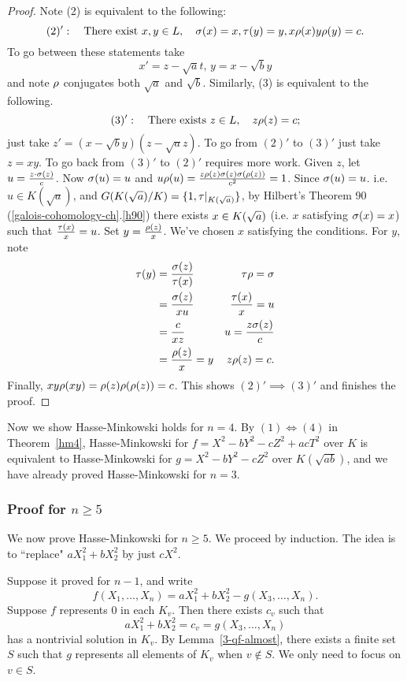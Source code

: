 \begin{proof}
Note (2) is equivalent to the following:
\[
(2)':\quad \text{There exist }x,y\in L,\quad \sigma(x)=x,\tau(y)=y, x\rho(x)y\rho(y)=c.
\]
To go between these statements take
\[
x'=z-\sqrt a t,\,y=x-\sqrt by
\]
and note $\rho$ conjugates both $\sqrt a$ and $\sqrt b$. Similarly, (3) is equivalent to the following.
\[
(3)': \quad \text{There exists }z\in L,\quad z\rho(z)=c;
\]
just take $z'=(x-\sqrt by)(z-\sqrt az)$. To go from $(2)'$ to $(3)'$ just take $z=xy$. To go back from $(3)'$ to $(2)'$ requires more work. Given $z$, let $u=\frac{z\cdot \sigma(z)}{c}$. Now $\sigma(u)=u$ and $u\rho(u)=\frac{z\rho(z)\sigma(z)\sigma(\rho(z))}{c^2}=1$. Since $\sigma(u)=u$. i.e. $u\in K(\sqrt a)$, and $G(K(\sqrt{a})/K)=\{1,\tau|_{K(\sqrt{a})}\}$, by Hilbert's Theorem 90 (\ref{galois-cohomology-ch}.\ref{h90}) there exists $x\in K(\sqrt{a})$ (i.e. $x$ satisfying $\sigma(x)=x$) such that $\frac{\tau(x)}{x}=u$. Set $y=\frac{\rho(z)}{x}$. We've chosen $x$ satisfying the conditions. For $y$, note
\begin{align*}
\tau(y)&=\frac{\sigma(z)}{\tau(x)}&\tau\rho=\sigma\\
&=\frac{\sigma(z)}{xu} &\frac{\tau(x)}{x}=u\\
&=\frac{c}{xz}&u=\frac{z\sigma(z)}{c}\\
&=\frac{\rho(z)}{x}=y&z\rho(z)=c.
\end{align*}
Finally, $xy\rho(xy)=\rho(z)\rho(\rho(z))=c$. This shows $(2)'\implies (3)'$ and finishes the proof.
\end{proof}
Now we show Hasse-Minkowski holds for $n=4$. By $(1)\iff (4)$ in Theorem~\ref{hm4}, Hasse-Minkowski for $f=X^2-bY^2-cZ^2+acT^2$ over $K$ is equivalent to Hasse-Minkowski for $g=X^2-bY^2-cZ^2$ over $K(\sqrt{ab})$,  and we have already proved Hasse-Minkowski for $n=3$.
\subsubsection{Proof for $n\ge 5$}
We now prove Hasse-Minkowski for $n\ge 5$. We proceed by induction. The idea is to ``replace" $aX_1^2+bX_2^2$ by just $cX^2$.

Suppose it proved for $n-1$, and write
\[
f(X_1,\ldots, X_n)=aX_1^2+bX_2^2-g(X_3,\ldots, X_n).
\]
Suppose $f$ represents 0 in each $K_v$. Then there exists $c_v$ such that
\[
aX_1^2+bX_2^2=c_v=g(X_3,\ldots, X_n)
\]
has a nontrivial solution in $K_v$. By Lemma~\ref{3-qf-almost}, there exists a finite set $S$ such that $g$ represents all elements of $K_v$ when $v\nin S$. We only need to focus on $v\in S$.

